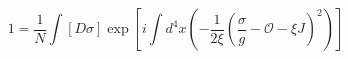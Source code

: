 \begin{equation}  \label{19}
1=\frac{1}{N}\int [D\sigma]\exp\left[i\int d^{4}x\left(-\frac{1}{2\xi}\left(%
\frac{\sigma}{g}-\mathcal{O}-\xi J\right)^{2}\right)\right]
\end{equation}

